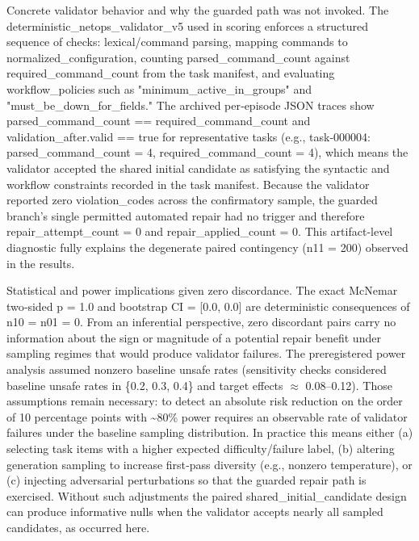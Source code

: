 \documentclass[conference]{IEEEtran}
\begin{document}
Concrete validator behavior and why the guarded path was not invoked. The deterministic\_netops\_validator\_v5 used in scoring enforces a structured sequence of checks: lexical/command parsing, mapping commands to normalized\_configuration, counting parsed\_command\_count against required\_command\_count from the task manifest, and evaluating workflow\_policies such as "minimum\_active\_in\_groups" and "must\_be\_down\_for\_fields." The archived per‑episode JSON traces show parsed\_command\_count == required\_command\_count and validation\_after.valid == true for representative tasks (e.g., task‑000004: parsed\_command\_count = 4, required\_command\_count = 4), which means the validator accepted the shared initial candidate as satisfying the syntactic and workflow constraints recorded in the task manifest. Because the validator reported zero violation\_codes across the confirmatory sample, the guarded branch's single permitted automated repair had no trigger and therefore repair\_attempt\_count = 0 and repair\_applied\_count = 0. This artifact‑level diagnostic fully explains the degenerate paired contingency (n11 = 200) observed in the results.

Statistical and power implications given zero discordance. The exact McNemar two‑sided p = 1.0 and bootstrap CI = [0.0, 0.0] are deterministic consequences of n10 = n01 = 0. From an inferential perspective, zero discordant pairs carry no information about the sign or magnitude of a potential repair benefit under sampling regimes that would produce validator failures. The preregistered power analysis assumed nonzero baseline unsafe rates (sensitivity checks considered baseline unsafe rates in \{0.2, 0.3, 0.4\} and target effects \ensuremath{\approx} 0.08--0.12). Those assumptions remain necessary: to detect an absolute risk reduction on the order of 10 percentage points with \textasciitilde{}80\% power requires an observable rate of validator failures under the baseline sampling distribution. In practice this means either (a) selecting task items with a higher expected difficulty/failure label, (b) altering generation sampling to increase first‑pass diversity (e.g., nonzero temperature), or (c) injecting adversarial perturbations so that the guarded repair path is exercised. Without such adjustments the paired shared\_initial\_candidate design can produce informative nulls when the validator accepts nearly all sampled candidates, as occurred here.
\end{document}
